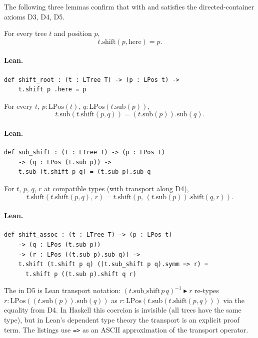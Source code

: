 \documentclass[11pt,a4paper]{article}
\begin{document}
The following three lemmas confirm that  with  and
 satisfies the directed-container axioms D3, D4, D5.

\begin{thm}
For every tree $t$ and position $p$,
\[
  t.\mathrm{shift}(p, \mathrm{here}) = p.
\]
\end{thm}

\paragraph{Lean.}
\begin{lstlisting}[style=lean]
def shift_root : (t : LTree T) -> (p : LPos t) ->
    t.shift p .here = p
\end{lstlisting}

\begin{thm}
For every $t$, $p : \mathrm{LPos}(t)$, $q : \mathrm{LPos}(t.\mathrm{sub}(p))$,
\[
  t.\mathrm{sub}(t.\mathrm{shift}(p, q)) = (t.\mathrm{sub}(p)).\mathrm{sub}(q).
\]
\end{thm}

\paragraph{Lean.}
\begin{lstlisting}[style=lean]
def sub_shift : (t : LTree T) -> (p : LPos t)
    -> (q : LPos (t.sub p)) ->
    t.sub (t.shift p q) = (t.sub p).sub q
\end{lstlisting}

\begin{thm}
For $t$, $p$, $q$, $r$ at compatible types (with transport along D4),
\[
  t.\mathrm{shift}(t.\mathrm{shift}(p, q),\, r) =
  t.\mathrm{shift}(p,\, (t.\mathrm{sub}(p)).\mathrm{shift}(q, r)).
\]
\end{thm}

\paragraph{Lean.}
\begin{lstlisting}[style=lean]
def shift_assoc : (t : LTree T) -> (p : LPos t)
    -> (q : LPos (t.sub p))
    -> (r : LPos ((t.sub p).sub q)) ->
    t.shift (t.shift p q) ((t.sub_shift p q).symm => r) =
      t.shift p ((t.sub p).shift q r)
\end{lstlisting}

\begin{fidelitynote}
The \lean{=>} in D5 is Lean transport notation: $(t.\mathrm{sub\_shift}\,p\,q)^{-1}
\blacktriangleright r$ re-types $r : \mathrm{LPos}((t.\mathrm{sub}(p)).\mathrm{sub}(q))$
as $r : \mathrm{LPos}(t.\mathrm{sub}(t.\mathrm{shift}(p,q)))$ via the equality from D4.
In Haskell this coercion is invisible (all trees have the same type), but
in Lean's dependent type theory the transport is an explicit proof term.
The listings use \texttt{=>} as an ASCII approximation of the transport operator.
\end{fidelitynote}
\end{document}
